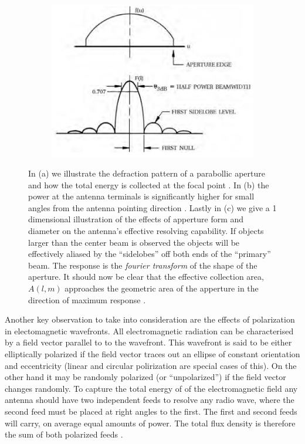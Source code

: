 \documentclass[a4paper,10pt]{report}
\begin{document}
\begin{figure}[ht]
\begin{mdframed}
  \begin{subfigure}[b]{0.3\textwidth}
   \includegraphics[width=\textwidth]{images/radiation_pattern.png}
   \caption{}
  \end{subfigure}
  \caption[Collection of electromagnetic wave energy and responce]{In (a) we illustrate the defraction pattern of a parabollic aperture and how the total energy is collected at the focal point \cite{christiansenradiotelescopes}. In (b) the power at the antenna terminals
  is significantly higher for small angles from the antenna pointing direction \cite{christiansenradiotelescopes}. Lastly in (c) we give a 1 dimensional illustration of the effects of apperture form and diameter on the antenna's effective resolving capability. If objects
  larger than the center beam is observed the objects will be effectively aliased by the ``sidelobes'' off both ends of the ``primary'' beam. The response is the \textit{fourier transform} of the shape of the aperture. It should now be clear
  that the effective collection area, $A(l,m)$ approaches the geometric area of the apperture in the direction of maximum response \cite{taylor1999synthesis}.}
  \label{diffraction_pattern_and_power_at_focus}
 \end{mdframed}
\end{figure}

Another key observation to take into consideration are the effects of polarization in electomagnetic wavefronts. All electromagnetic radiation can be characterised by a field vector parallel to to the wavefront. This wavefront is said to
be either elliptically polarized if the field vector traces out an ellipse of constant orientation and eccentricity (linear and circular polirization are special cases of this). On the other hand it may be randomly polarized (or ``unpolarized'') if the field 
vector changes randomly. To capture the total energy of of the electromagnetic field any antenna should have two independent feeds to resolve any radio wave, where the second feed must be placed at right angles to the first. The first and second feeds will carry, 
on average equal amounts of power. The total flux density is therefore the sum of both polarized feeds \cite{christiansenradiotelescopes}.
\end{document}
